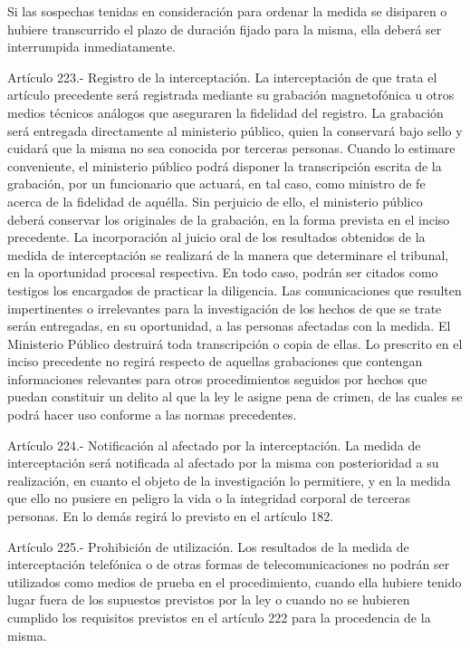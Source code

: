     Si las sospechas tenidas en consideración para ordenar la medida se disiparen o hubiere transcurrido el plazo de duración fijado para la misma, ella deberá ser interrumpida inmediatamente.



    Artículo 223.- Registro de la interceptación. La interceptación de que trata el artículo precedente será registrada mediante su grabación magnetofónica u otros medios técnicos análogos que aseguraren la fidelidad del registro. La grabación será entregada directamente al ministerio público, quien la conservará bajo sello y cuidará que la misma no sea conocida por terceras personas.
    Cuando lo estimare conveniente, el ministerio público podrá disponer la transcripción escrita de la grabación, por un funcionario que actuará, en tal caso, como ministro de fe acerca de la fidelidad de aquélla. Sin perjuicio de ello, el ministerio público deberá conservar los originales de la grabación, en la forma prevista en el inciso precedente.
    La incorporación al juicio oral de los resultados obtenidos de la medida de interceptación se realizará de la manera que determinare el tribunal, en la oportunidad procesal respectiva. En todo caso, podrán ser citados como testigos los encargados de practicar la diligencia.
    Las comunicaciones que resulten impertinentes o irrelevantes para la investigación de los hechos de que se trate serán entregadas, en su oportunidad, a las personas afectadas con la medida. El Ministerio Público destruirá toda transcripción o copia de ellas.
    Lo prescrito en el inciso precedente no regirá respecto de aquellas grabaciones que contengan informaciones relevantes para otros procedimientos seguidos por hechos que puedan constituir un delito al que la ley le asigne pena de crimen, de las cuales se podrá hacer uso conforme a las normas precedentes.

    Artículo 224.- Notificación al afectado por la interceptación. La medida de interceptación será notificada al afectado por la misma con posterioridad a su realización, en cuanto el objeto de la investigación lo permitiere, y en la medida que ello no pusiere en peligro la vida o la integridad corporal de terceras personas. En lo demás regirá lo previsto en el artículo 182.

    Artículo 225.- Prohibición de utilización. Los resultados de la medida de interceptación telefónica o de otras formas de telecomunicaciones no podrán ser utilizados como medios de prueba en el procedimiento, cuando ella hubiere tenido lugar fuera de los supuestos previstos por la ley o cuando no se hubieren cumplido los requisitos previstos en el artículo 222 para la procedencia de la misma.


